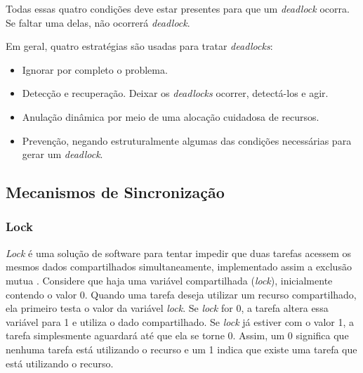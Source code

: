 Todas essas quatro condições deve estar presentes para que um
\textit{deadlock} ocorra. Se faltar uma delas, não ocorrerá
\textit{deadlock}.

Em geral, quatro estratégias são usadas para tratar \textit{deadlocks}:

\begin{itemize}
\item Ignorar por completo o problema.
\item Detecção e recuperação. Deixar os \textit{deadlocks} ocorrer,
detectá-los e agir.
\item Anulação dinâmica por meio de uma alocação cuidadosa de recursos.
\item Prevenção, negando estruturalmente algumas das condições necessárias
para gerar um \textit{deadlock}.
\end{itemize}

%
%
%

\subsection{Mecanismos de Sincronização}


\subsubsection{Lock}

\textit{Lock} é uma solução de software para tentar impedir que duas
tarefas acessem os mesmos dados compartilhados simultaneamente,
implementado assim a exclusão mutua \cite{MCRT}. Considere que haja uma variável
compartilhada (\textit{lock}), inicialmente contendo o valor 0. Quando uma
tarefa deseja utilizar um recurso compartilhado, ela primeiro testa 
o valor da variável \textit{lock}. Se \textit{lock} for 0, a tarefa
altera essa variável para 1 e utiliza o dado compartilhado. Se \textit{lock}
já estiver com o valor 1, a tarefa simplesmente aguardará até que ela
se torne 0. Assim, um 0 significa que nenhuma tarefa está utilizando o
recurso e um 1 indica que existe uma tarefa que está utilizando o recurso.


